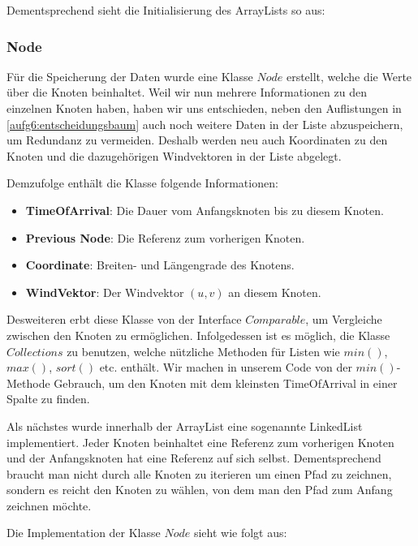 Dementsprechend sieht die Initialisierung des ArrayLists so aus:



\subsubsection{Node}
Für die Speicherung der Daten wurde eine Klasse $Node$ erstellt, welche die
Werte über die Knoten beinhaltet. Weil wir nun mehrere Informationen zu den
einzelnen Knoten haben, haben wir uns entschieden, neben den Auflistungen in
\ref{aufg6:entscheidungsbaum} auch noch weitere Daten in der Liste
abzuspeichern, um Redundanz zu vermeiden. Deshalb werden neu auch Koordinaten
zu den Knoten und die dazugehörigen Windvektoren in der Liste abgelegt.

Demzufolge enthält die Klasse folgende Informationen:

\begin{itemize}
\item \textbf{TimeOfArrival}: Die Dauer vom Anfangsknoten bis zu diesem Knoten.
\item \textbf{Previous Node}: Die Referenz zum vorherigen Knoten.
\item \textbf{Coordinate}: Breiten- und Längengrade des Knotens.
\item \textbf{WindVektor}: Der Windvektor $(u, v)$ an diesem Knoten.
\end{itemize}

Desweiteren erbt diese Klasse von der Interface $Comparable$, um Vergleiche
zwischen den Knoten zu ermöglichen. Infolgedessen ist es möglich, die Klasse
$Collections$ zu benutzen, welche nützliche Methoden für Listen wie $min()$,
$max()$, $sort()$ etc. enthält. Wir machen in unserem Code von der
$min()$-Methode Gebrauch, um den Knoten mit dem kleinsten TimeOfArrival in
einer Spalte zu finden.

Als nächstes wurde innerhalb der ArrayList eine sogenannte LinkedList
implementiert. Jeder Knoten beinhaltet eine Referenz zum vorherigen Knoten und
der Anfangsknoten hat eine Referenz auf sich selbst. Dementsprechend braucht
man nicht durch alle Knoten zu iterieren um einen Pfad zu zeichnen, sondern es
reicht den Knoten zu wählen, von dem man den Pfad zum Anfang zeichnen möchte.

Die Implementation der Klasse $Node$ sieht wie folgt aus:





